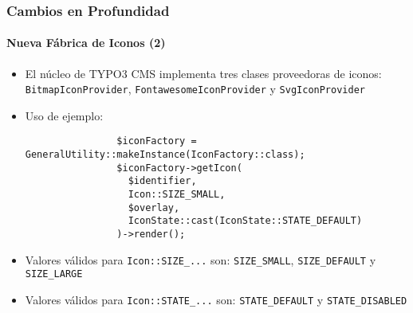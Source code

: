 \begin{frame}[fragile]
	\frametitle{Cambios en Profundidad}
	\framesubtitle{Nueva Fábrica de Iconos (2)}

	\lstset{basicstyle=\tiny\ttfamily}

	\begin{itemize}

		\item El núcleo de TYPO3 CMS implementa tres clases proveedoras de iconos:\newline
			\smaller
				\texttt{BitmapIconProvider}, \texttt{FontawesomeIconProvider} y \texttt{SvgIconProvider}
			\normalsize

		\item Uso de ejemplo:

			\begin{lstlisting}
				$iconFactory = GeneralUtility::makeInstance(IconFactory::class);
				$iconFactory->getIcon(
				  $identifier,
				  Icon::SIZE_SMALL,
				  $overlay,
				  IconState::cast(IconState::STATE_DEFAULT)
				)->render();
			\end{lstlisting}

		\item Valores válidos para \texttt{Icon::SIZE\_...} son:\newline
			\small\texttt{SIZE\_SMALL}, \texttt{SIZE\_DEFAULT} y \texttt{SIZE\_LARGE}\normalsize
			\vspace{0.4cm}

		\item Valores válidos para \texttt{Icon::STATE\_...} son:\newline
			\small\texttt{STATE\_DEFAULT} y \texttt{STATE\_DISABLED}\normalsize

	\end{itemize}

\end{frame}


